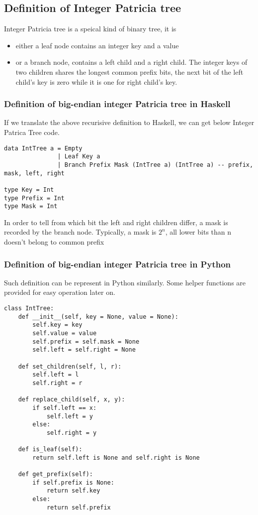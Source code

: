 \documentclass{article}
\begin{document}
\subsection{Definition of Integer Patricia tree}
Integer Patricia tree is a speical kind of binary tree, it is
\begin{itemize}
\item either a leaf node contains an integer key and a value
\item or a branch node, contains a left child and a right child. The
integer keys of two children shares the longest common prefix bits,
the next bit of the left child's key is zero while it is one for right
child's key.
\end{itemize}

\subsubsection*{Definition of big-endian integer Patricia tree in Haskell}
If we translate the above recurisive definition to Haskell, we can get
below Integer Patrica Tree code.

\lstset{language=Haskell}
\begin{lstlisting}
data IntTree a = Empty 
               | Leaf Key a
               | Branch Prefix Mask (IntTree a) (IntTree a) -- prefix, mask, left, right

type Key = Int
type Prefix = Int
type Mask = Int
\end{lstlisting}

In order to tell from which bit the left and right children differ, a
mask is recorded by the branch node. Typically, a mask is $2^n$, all
lower bits than n doesn't belong to common prefix

\subsubsection*{Definition of big-endian integer Patricia tree in Python}
Such definition can be represent in Python similarly. Some helper
functions are provided for easy operation later on.

\lstset{language=Python}
\begin{lstlisting}
class IntTree:
    def __init__(self, key = None, value = None):
        self.key = key
        self.value = value
        self.prefix = self.mask = None
        self.left = self.right = None

    def set_children(self, l, r):
        self.left = l
        self.right = r

    def replace_child(self, x, y):
        if self.left == x:
            self.left = y
        else:
            self.right = y

    def is_leaf(self):
        return self.left is None and self.right is None

    def get_prefix(self):
        if self.prefix is None:
            return self.key
        else:
            return self.prefix
\end{lstlisting}
\end{document}
